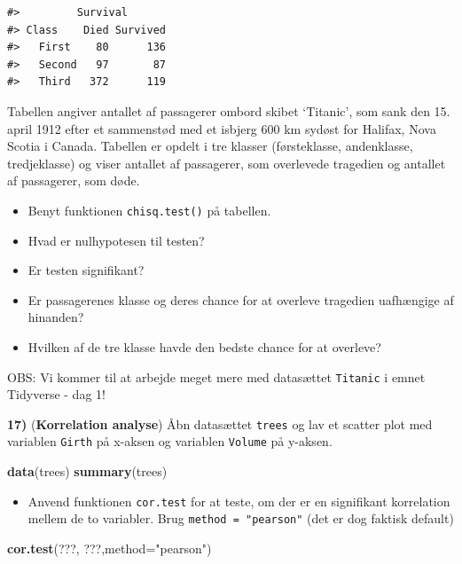\documentclass[
]{book}
\newenvironment{Shaded}{\begin{snugshade}}{\end{snugshade}}
\newcommand{\AttributeTok}[1]{\textcolor[rgb]{0.27,0.27,0.27}{#1}}
\newcommand{\FunctionTok}[1]{\textcolor[rgb]{0.27,0.27,0.27}{\textbf{#1}}}
\newcommand{\NormalTok}[1]{#1}
\newcommand{\StringTok}[1]{\textcolor[rgb]{0.5,0.5,0.5}{#1}}
\providecommand{\tightlist}{%
  \setlength{\itemsep}{0pt}\setlength{\parskip}{0pt}}
\begin{document}
\begin{verbatim}
#>         Survival
#> Class    Died Survived
#>   First    80      136
#>   Second   97       87
#>   Third   372      119
\end{verbatim}

Tabellen angiver antallet af passagerer ombord skibet `Titanic', som sank den 15. april 1912 efter et sammenstød med et isbjerg 600 km sydøst for Halifax, Nova Scotia i Canada. Tabellen er opdelt i tre klasser (førsteklasse, andenklasse, tredjeklasse) og viser antallet af passagerer, som overlevede tragedien og antallet af passagerer, som døde.

\begin{itemize}
\item
  Benyt funktionen \texttt{chisq.test()} på tabellen.
\item
  Hvad er nulhypotesen til testen?
\item
  Er testen signifikant?
\item
  Er passagerenes klasse og deres chance for at overleve tragedien uafhængige af hinanden?
\item
  Hvilken af de tre klasse havde den bedste chance for at overleve?
\end{itemize}

OBS: Vi kommer til at arbejde meget mere med datasættet \texttt{Titanic} i emnet Tidyverse - dag 1!

\textbf{17)} (\textbf{Korrelation analyse}) Åbn datasættet \texttt{trees} og lav et scatter plot med variablen \texttt{Girth} på x-aksen og variablen \texttt{Volume} på y-aksen.

\begin{Shaded}
\begin{Highlighting}[]
\FunctionTok{data}\NormalTok{(trees)}
\FunctionTok{summary}\NormalTok{(trees)}
\end{Highlighting}
\end{Shaded}

\begin{itemize}
\tightlist
\item
  Anvend funktionen \texttt{cor.test} for at teste, om der er en signifikant korrelation mellem de to variabler. Brug \texttt{method\ =\ "pearson"} (det er dog faktisk default)
\end{itemize}

\begin{Shaded}
\begin{Highlighting}[]
\FunctionTok{cor.test}\NormalTok{(???, ???,}\AttributeTok{method=}\StringTok{"pearson"}\NormalTok{)}
\end{Highlighting}
\end{Shaded}
\end{document}
